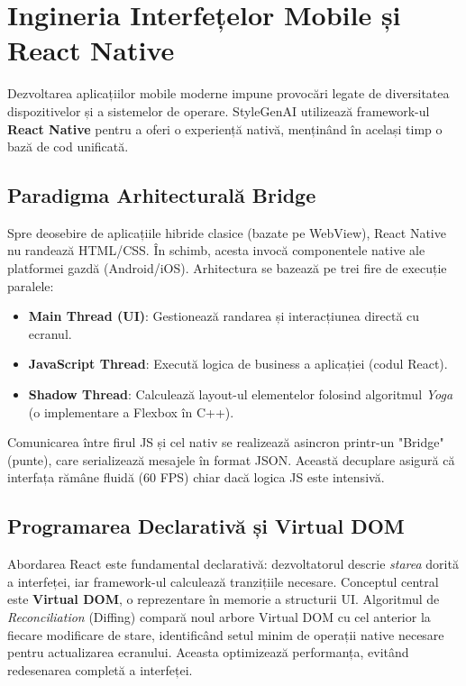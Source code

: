 \section{Ingineria Interfețelor Mobile și React Native}

Dezvoltarea aplicațiilor mobile moderne impune provocări legate de diversitatea dispozitivelor și a sistemelor de operare. StyleGenAI utilizează framework-ul \textbf{React Native} pentru a oferi o experiență nativă, menținând în același timp o bază de cod unificată.

\subsection{Paradigma Arhitecturală Bridge}
Spre deosebire de aplicațiile hibride clasice (bazate pe WebView), React Native nu randează HTML/CSS. În schimb, acesta invocă componentele native ale platformei gazdă (Android/iOS).
Arhitectura se bazează pe trei fire de execuție paralele:
\begin{itemize}
    \item \textbf{Main Thread (UI)}: Gestionează randarea și interacțiunea directă cu ecranul.
    \item \textbf{JavaScript Thread}: Execută logica de business a aplicației (codul React).
    \item \textbf{Shadow Thread}: Calculează layout-ul elementelor folosind algoritmul \textit{Yoga} (o implementare a Flexbox în C++).
\end{itemize}
Comunicarea între firul JS și cel nativ se realizează asincron printr-un "Bridge" (punte), care serializează mesajele în format JSON. Această decuplare asigură că interfața rămâne fluidă (60 FPS) chiar dacă logica JS este intensivă.

\subsection{Programarea Declarativă și Virtual DOM}
Abordarea React este fundamental declarativă: dezvoltatorul descrie \textit{starea} dorită a interfeței, iar framework-ul calculează tranzițiile necesare.
Conceptul central este \textbf{Virtual DOM}, o reprezentare în memorie a structurii UI.
Algoritmul de \textit{Reconciliation} (Diffing) compară noul arbore Virtual DOM cu cel anterior la fiecare modificare de stare, identificând setul minim de operații native necesare pentru actualizarea ecranului. Aceasta optimizează performanța, evitând redesenarea completă a interfeței.


